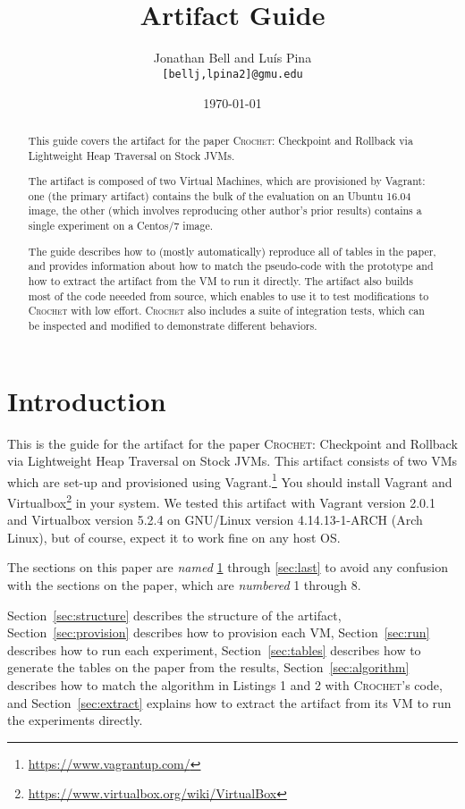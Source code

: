 \documentclass[12pt]{article}
\title{\emph{\papertitle} \\ Artifact Guide}
\author{Jonathan Bell and Lu\'{i}s Pina \\ \texttt{[bellj,lpina2]@gmu.edu}}
\affil{George Mason University}
\date{\today}
\newcommand{\sysname}{\textsc{Crochet}\xspace}
\newcommand{\papertitle}{\sysname: Checkpoint and Rollback via Lightweight Heap Traversal on Stock JVMs\xspace}
\begin{document}
\maketitle

\begin{abstract}

    This guide covers the artifact for the paper \papertitle.

    The artifact is composed of two Virtual Machines, which are provisioned by
    Vagrant: one (the primary artifact) contains the bulk of the evaluation on an Ubuntu 16.04 image,
    the other (which involves reproducing other author's prior results) contains a single experiment on a Centos/7 image.

    The guide describes how to (mostly automatically) reproduce all of tables in the paper,
    and provides information about how to match the pseudo-code with the
    prototype and how to extract the artifact from the VM to run it directly.
    The artifact also builds most of the code neeeded from source, which enables
    to use it to test modifications to \sysname with low effort. \sysname also includes a suite of integration tests, which can be inspected and modified to demonstrate different behaviors.

\end{abstract}

\section{Introduction}
\label{sec:first}

This is the guide for the artifact for the paper \papertitle.  This artifact consists
of two VMs which are set-up and provisioned using
Vagrant.\footnote{\url{https://www.vagrantup.com/}}  You should install Vagrant
and Virtualbox\footnote{\url{https://www.virtualbox.org/wiki/VirtualBox}} in
your system.  We tested this artifact with Vagrant version 2.0.1 and Virtualbox
version 5.2.4 on GNU/Linux version 4.14.13-1-ARCH (Arch Linux), but of course, expect it to work fine on any host OS.

The sections on this paper are \emph{named} \ref{sec:first} through
\ref{sec:last} to avoid any confusion with the sections on the paper, which are
\emph{numbered} 1 through 8.

Section~\ref{sec:structure} describes the structure of the artifact,
Section~\ref{sec:provision} describes how to provision each VM,
Section~\ref{sec:run} describes how to run each experiment,
Section~\ref{sec:tables} describes how to generate the tables on the paper from
the results, Section~\ref{sec:algorithm} describes how to match the algorithm in
Listings 1 and 2 with \sysname's code, and Section~\ref{sec:extract} explains how to
extract the artifact from its VM to run the experiments directly.
\end{document}
